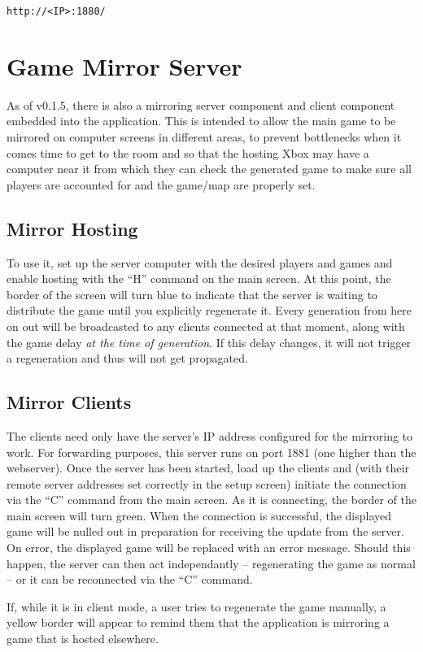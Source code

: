 \documentclass[pdftex,10pt,a4paper]{report}
\begin{document}
\begin{verbatim}
http://<IP>:1880/
\end{verbatim}

\section{Game Mirror Server}
As of v0.1.5, there is also a mirroring server component and client component embedded into the application.  This is intended to allow the main game to be mirrored on computer screens in different areas, to prevent bottlenecks when it comes time to get to the room and so that the hosting Xbox may have a computer near it from which they can check the generated game to make sure all players are accounted for and the game/map are properly set.
\subsection{Mirror Hosting}
To use it, set up the server computer with the desired players and games and enable hosting with the ``H'' command on the main screen.  At this point, the border of the screen will turn blue to indicate that the server is waiting to distribute the game until you explicitly regenerate it.  Every generation from here on out will be broadcasted to any clients connected at that moment, along with the game delay \textit{at the time of generation}.  If this delay changes, it will not trigger a regeneration and thus will not get propagated.

\subsection{Mirror Clients}
The clients need only have the server's IP address configured for the mirroring to work.  For forwarding purposes, this server runs on port 1881 (one higher than the webserver).  Once the server has been started, load up the clients and (with their remote server addresses set correctly in the setup screen) initiate the connection via the ``C'' command from the main screen.  As it is connecting, the border of the main screen will turn green.  When the connection is successful, the displayed game will be nulled out in preparation for receiving the update from the server.  On error, the displayed game will be replaced with an error message.  Should this happen, the server can then act independantly -- regenerating the game as normal -- or it can be reconnected via the ``C'' command.

If, while it is in client mode, a user tries to regenerate the game manually, a yellow border will appear to remind them that the application is mirroring a game that is hosted elsewhere.
\end{document}
